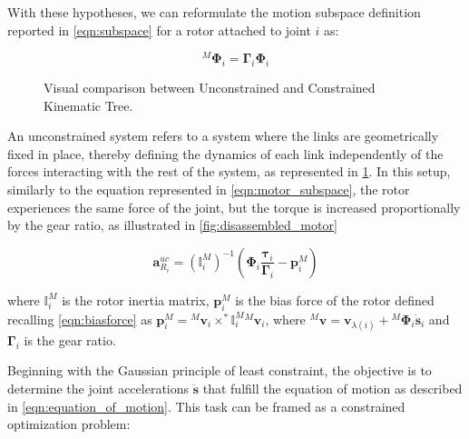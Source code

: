 With these hypotheses, we can reformulate the motion subspace definition reported in \cref{eqn:subspace} for a rotor attached to joint $i$ as:

\begin{equation}
    \label{eqn:motor_subspace}
    {} ^M \boldsymbol{\Phi} _i = \boldsymbol{\Gamma} _i \boldsymbol{\Phi} _i
\end{equation}


\begin{figure}
    \centering
    \caption{Visual comparison between Unconstrained and Constrained Kinematic Tree.}
    \label{fig:uc_and_constr_tree}
\end{figure}

An unconstrained system refers to a system where the links are geometrically fixed in place, thereby defining the dynamics of each link independently of the forces interacting with the rest of the system, as represented in \cref{fig:uc_and_constr_tree}. In this setup, similarly to the equation represented in \cref{eqn:motor_subspace}, the rotor experiences the same force of the joint, but the torque is increased proportionally by the gear ratio, as illustrated in \cref{fig:disassembled_motor}

\begin{equation}
    \mathbf{a} ^{uc} _{R _i} = (\mathbb{I} ^M _i) ^{-1}(\boldsymbol{\Phi} _i \frac{\boldsymbol{\tau} _i}{\boldsymbol{\Gamma} _i} - \mathbf{p} ^M _i)
\end{equation}

where $\mathbb{I} ^M _i$ is the rotor inertia matrix, $\mathbf{p} ^M _i$ is the bias force of the rotor defined recalling \cref{eqn:biasforce} as  $\mathbf{p} ^M _i = {} ^M \mathbf{v} _i\times ^* \mathbb{I} ^M _i {} ^M \mathbf{v} _i$, where ${} ^M \mathbf{v} = \mathbf{v} _{\lambda (i)} + {} ^M \boldsymbol{\Phi} _i \dot{\mathbf{s}} _i$ and $\boldsymbol{\Gamma} _i$ is the gear ratio.

Beginning with the Gaussian principle of least constraint, the objective is to determine the joint accelerations $\ddot{\mathbf{s}}$ that fulfill the equation of motion as described in \cref{eqn:equation_of_motion}. This task can be framed as a constrained optimization problem:

